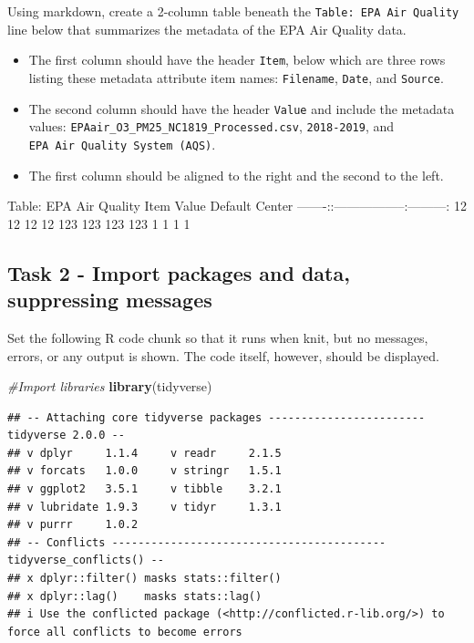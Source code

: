 \documentclass[
]{article}
\newenvironment{Shaded}{\begin{snugshade}}{\end{snugshade}}
\newcommand{\CommentTok}[1]{\textcolor[rgb]{0.56,0.35,0.01}{\textit{#1}}}
\newcommand{\FunctionTok}[1]{\textcolor[rgb]{0.13,0.29,0.53}{\textbf{#1}}}
\newcommand{\NormalTok}[1]{#1}
\begin{document}
Using markdown, create a 2-column table beneath the
\texttt{Table:\ EPA\ Air\ Quality} line below that summarizes the
metadata of the EPA Air Quality data.

\begin{itemize}
\item
  The first column should have the header \texttt{Item}, below which are
  three rows listing these metadata attribute item names:
  \texttt{Filename}, \texttt{Date}, and \texttt{Source}.
\item
  The second column should have the header \texttt{Value} and include
  the metadata values: \texttt{EPAair\_O3\_PM25\_NC1819\_Processed.csv},
  \texttt{2018-2019}, and \texttt{EPA\ Air\ Quality\ System\ (AQS)}.
\item
  The first column should be aligned to the right and the second to the
  left.
\end{itemize}

Table: EPA Air Quality \textbar{} Item \textbar{} Value \textbar{}
Default \textbar{} Center \textbar{}
\textbar-------:\textbar:------\textbar-----------\textbar:---------:\textbar{}
\textbar{} 12 \textbar{} 12 \textbar{} 12 \textbar{} 12 \textbar{}
\textbar{} 123 \textbar{} 123 \textbar{} 123 \textbar{} 123 \textbar{}
\textbar{} 1 \textbar{} 1 \textbar{} 1 \textbar{} 1 \textbar{}

\subsection{Task 2 - Import packages and data, suppressing
messages}\label{task-2---import-packages-and-data-suppressing-messages}

Set the following R code chunk so that it runs when knit, but no
messages, errors, or any output is shown. The code itself, however,
should be displayed.

\begin{Shaded}
\begin{Highlighting}[]
\CommentTok{\#Import libraries}
\FunctionTok{library}\NormalTok{(tidyverse)}
\end{Highlighting}
\end{Shaded}

\begin{verbatim}
## -- Attaching core tidyverse packages ------------------------ tidyverse 2.0.0 --
## v dplyr     1.1.4     v readr     2.1.5
## v forcats   1.0.0     v stringr   1.5.1
## v ggplot2   3.5.1     v tibble    3.2.1
## v lubridate 1.9.3     v tidyr     1.3.1
## v purrr     1.0.2     
## -- Conflicts ------------------------------------------ tidyverse_conflicts() --
## x dplyr::filter() masks stats::filter()
## x dplyr::lag()    masks stats::lag()
## i Use the conflicted package (<http://conflicted.r-lib.org/>) to force all conflicts to become errors
\end{verbatim}
\end{document}
